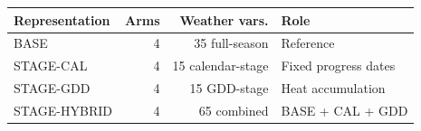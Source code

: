 \begin{tabular}{lrrl}
\toprule
Representation & Arms & Weather vars. & Role \\
\midrule
BASE & 4 & 35 full-season & Reference \\
STAGE-CAL & 4 & 15 calendar-stage & Fixed progress dates \\
STAGE-GDD & 4 & 15 GDD-stage & Heat accumulation \\
STAGE-HYBRID & 4 & 65 combined & BASE + CAL + GDD \\
\bottomrule
\end{tabular}
